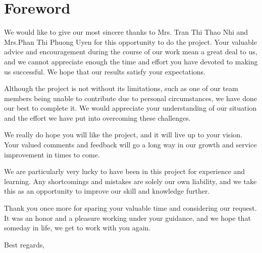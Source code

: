 \section{Foreword}
\label{sec:foreword}

\hspace{1cm} We would like to give our most sincere thanks to Mrs. Tran Thi Thao Nhi and Mrs.Phan Thi Phuong Uyen for this opportunity to do the project. Your valuable advice and encouragement during the course of our work mean a great deal to us, and we cannot appreciate enough the time and effort you have devoted to making us successful. We hope that our results satisfy your expectations.

\vspace{0.5cm}

\hspace{1cm} Although the project is not without its limitations, such as one of our team members being unable to contribute due to personal circumstances, we have done our best to complete it. We would appreciate your understanding of our situation and the effort we have put into overcoming these challenges.

\vspace{0.5cm}

\hspace{1cm} We really do hope you will like the project, and it will live up to your vision. Your valued comments and feedback will go a long way in our growth and service improvement in times to come.

\vspace{0.5cm}

\hspace{1cm} We are particularly very lucky to have been in this project for experience and learning. Any shortcomings and mistakes are solely our own liability, and we take this as an opportunity to improve our skill and knowledge further.

\vspace{0.5cm}

\hspace{1cm} Thank you once more for sparing your valuable time and considering our request. It was an honor and a pleasure working under your guidance, and we hope that someday in life, we get to work with you again.

\vspace{0.5cm}

\hspace{1cm} Best regards,
